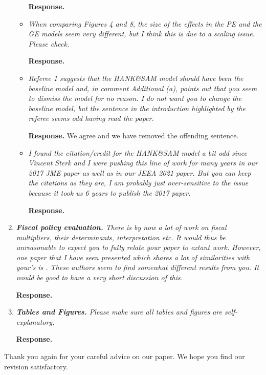 \documentclass[12pt,letterpaper,english]{article}
\begin{document}
\begin{enumerate}
\begin{itemize}
		\noindent \textbf{Response.} 
		
		\item \textit{When comparing Figures 4 and 8, the size of the effects in the PE and the GE models seem very different, but I think this is due to a scaling issue. Please check.}
		
		\noindent \textbf{Response.} 
		
		\item \textit{Referee 1 suggests that the HANK\&SAM model should have been the baseline model and, in comment Additional (a), points out that you seem to dismiss the model for no reason. I do not want you to change the baseline model, but	the sentence in the introduction highlighted by the referee seems odd having read the paper.}
		
		\noindent \textbf{Response.} We agree and we have removed the offending sentence.
		
		\item \textit{I found the citation/credit for the HANK\&SAM model a bit odd since Vincent Sterk and I were pushing this line of work for many years in our 2017 JME	paper as well as in our JEEA 2021 paper. But you can keep the citations as they are, I am probably just over-sensitive to the issue because it took us 6 years to publish the 2017 paper.}
		
		\noindent \textbf{Response.} 
	\end{itemize}
	
\item \textit{\textbf{Fiscal policy evaluation.} There is by now a lot of work on fiscal multipliers, their determinants, interpretation etc. It would thus be unreasonable to expect you to fully relate your paper to extant work. However, one paper that I have seen presented which shares a lot of similarities with your's is \citet{broer2024stimulus}. These authors seem to find somewhat different results from you. It would be good	to have a very short discussion of this.}	

\noindent \textbf{Response.} 

\item \textit{\textbf{Tables and Figures.} Please make sure all tables and figures are self-explanatory.} 

\noindent \textbf{Response.} 

\end{enumerate}

\bigskip

\noindent Thank you again for your careful advice on our paper. We hope you find our revision satisfactory.



\end{document}
